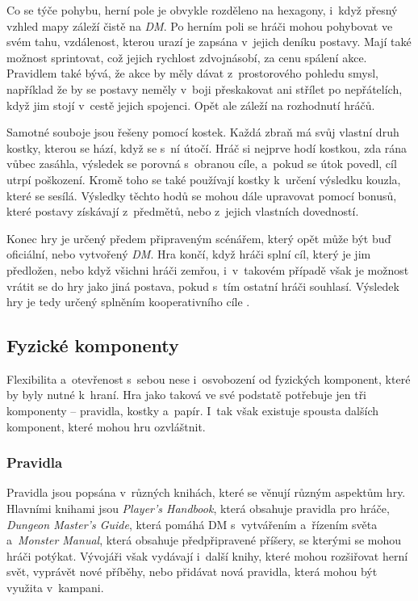 Co se týče pohybu, herní pole je obvykle rozděleno na hexagony, i~když přesný vzhled mapy záleží čistě na \textit{DM}. Po herním poli se hráči mohou pohybovat ve svém tahu, vzdálenost, kterou urazí je zapsána v~jejich deníku postavy. Mají také možnost sprintovat, což jejich rychlost zdvojnásobí, za cenu spálení akce. Pravidlem také bývá, že akce by měly dávat z~prostorového pohledu smysl, například že by se postavy neměly v~boji přeskakovat ani střílet po nepřátelích, když jim stojí v~cestě jejich spojenci. Opět ale záleží na rozhodnutí hráčů.

Samotné souboje jsou řešeny pomocí kostek. Každá zbraň má svůj vlastní druh kostky, kterou se hází, když se s~ní útočí. Hráč si nejprve hodí kostkou, zda rána vůbec zasáhla, výsledek se porovná s~obranou cíle, a~pokud se útok povedl, cíl utrpí poškození. Kromě toho se také používají kostky k~určení výsledku kouzla, které se sesílá. Výsledky těchto hodů se mohou dále upravovat pomocí bonusů, které postavy získávají z~předmětů, nebo z~jejich vlastních dovedností.

Konec hry je určený předem připraveným scénářem, který opět může být buď oficiální, nebo vytvořený \textit{DM}. Hra končí, když hráči splní cíl, který je jim předložen, nebo když všichni hráči zemřou, i~v~takovém případě však je možnost vrátit se do hry jako jiná postava, pokud s~tím ostatní hráči souhlasí. Výsledek hry je tedy určený splněním kooperativního cíle .

\subsection{Fyzické komponenty}
\label{subsec:dnd_components}

Flexibilita a~otevřenost \dnd{} s~sebou nese i~osvobození od fyzických komponent, které by byly nutné k~hraní. Hra jako taková ve své podstatě potřebuje jen tři komponenty -- pravidla, kostky a~papír. I~tak však existuje spousta dalších komponent, které mohou hru ozvláštnit.

\subsubsection*{Pravidla}
\label{subsubsec:dnd_comp_rules}

Pravidla \dnd{} jsou popsána v~různých knihách, které se věnují různým aspektům hry. Hlavními knihami jsou \textit{Player's Handbook}, která obsahuje pravidla pro hráče, \textit{Dungeon Master's Guide}, která pomáhá DM s~vytvářením a~řízením světa a~\textit{Monster Manual}, která obsahuje předpřipravené příšery, se kterými se mohou hráči potýkat. Vývojáři však vydávají i~další knihy, které mohou rozšiřovat herní svět, vyprávět nové příběhy, nebo přidávat nová pravidla, která mohou být využita v~kampani.

